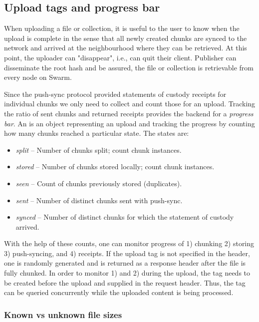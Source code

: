 \subsection{Upload tags and progress bar \statusgreen}\label{sec:tags}                                                                                        
When uploading a file or collection, it is useful to the user to know when the upload is complete in the sense that all newly created chunks are synced to the network and arrived at the neighbourhood where they can be retrieved. At this point, the  uploader can "disappear",  i.e., can quit their client. Publisher can disseminate the root hash and be assured, the file or collection is retrievable from every node on Swarm. 

Since the push-sync protocol provided statements of custody receipts for individual chunks we only need to collect and count those for an upload. Tracking the ratio of sent chunks and returned receipts provides the backend for a \emph{progress bar}. An  is an object representing an upload and tracking the progress by counting how many chunks reached a particular state. The states are: 

\begin{itemize}
\item \emph{split} -- Number of chunks split; count chunk instances.
\item \emph{stored} -- Number of chunks stored locally; count chunk instances.
\item \emph{seen} -- Count of chunks previously stored (duplicates).
\item \emph{sent} -- Number of distinct chunks sent with push-sync.
\item \emph{synced} -- Number of distinct chunks for which the statement of custody arrived.
\end{itemize}

With the help of these counts, one can monitor progress of 1) chunking 2) storing 3) push-syncing, and 4) receipts.
If the upload tag is not specified in the header, one is randomly generated and is returned as a response header after the file is fully chunked. In order to monitor 1) and  2) during the upload, the tag needs to be created before the upload and supplied in the request header. Thus, the tag can be queried concurrently while the uploaded content is being processed. 

\subsubsection{Known vs unknown file sizes}

